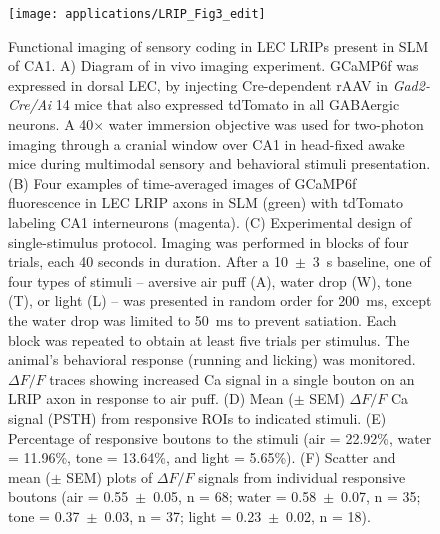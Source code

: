 \begin{figure}
	\centering
	\texttt{[image: applications/LRIP\_Fig3\_edit]}
	\caption[Functional imaging of sensory coding in LEC LRIPs present in SLM of CA1]{Functional imaging of sensory coding in LEC LRIPs present in SLM of CA1.
	A) Diagram of in vivo imaging experiment. GCaMP6f was expressed in dorsal LEC, by injecting Cre-dependent rAAV in \emph{Gad2-Cre/Ai} 14 mice that also expressed tdTomato in all GABAergic neurons. A 40$\times$ water immersion objective was used for two-photon imaging through a cranial window over CA1 in head-fixed awake mice during multimodal sensory and behavioral stimuli presentation.
	(B) Four examples of time-averaged images of GCaMP6f fluorescence in LEC LRIP axons in SLM (green) with tdTomato labeling CA1 interneurons (magenta).
	(C) Experimental design of single-stimulus protocol. Imaging was performed in blocks of four trials, each 40 seconds in duration. After a 10~$\pm$~3~s baseline, one of four types of stimuli -- aversive air puff (A), water drop (W), tone (T), or light (L) -- was presented in random order for 200~ms, except the water drop was limited to 50~ms to prevent satiation. Each block was repeated to obtain at least five trials per stimulus. The animal's behavioral response (running and licking) was monitored. $\Delta F/F$ traces showing increased Ca signal in a single bouton on an LRIP axon in response to air puff.
	(D) Mean ($\pm$ SEM) $\Delta F/F$ Ca signal (PSTH) from responsive ROIs to indicated stimuli.
	(E) Percentage of responsive boutons to the stimuli (air = 22.92\%, water = 11.96\%, tone = 13.64\%, and light = 5.65\%).
	(F) Scatter and mean ($\pm$ SEM) plots of $\Delta F/F$ signals from individual responsive boutons (air = 0.55~$\pm$~0.05, n = 68; water = 0.58~$\pm$~0.07, n = 35; tone = 0.37~$\pm$~0.03, n = 37; light = 0.23~$\pm$~0.02, n = 18).
	}
	\label{fig:applications:LRIP:imaging}
\end{figure}

